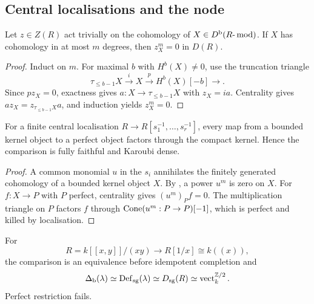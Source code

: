 \subsection{Central localisations and the node}
\begin{lemma}\label{lem:central-nilpotence}
Let \(z\in Z(R)\) act trivially on the cohomology of \(X\in D^{\mathrm b}(R\text{-}\operatorname{mod})\).  If \(X\) has cohomology in at most \(m\) degrees, then \(z_X^m=0\) in \(D(R)\).
\end{lemma}

\begin{proof}
Induct on \(m\).  For maximal \(b\) with \(H^b(X)\ne0\), use the truncation triangle
\[
 \tau_{\le b-1}X\xrightarrow{i}X\xrightarrow{p}H^b(X)[-b]\longrightarrow.
\]
Since \(pz_X=0\), exactness gives \(a:X\to\tau_{\le b-1}X\) with \(z_X=ia\).  Centrality gives \(az_X=z_{\tau_{\le b-1}X}a\), and induction yields \(z_X^m=0\).
\end{proof}

\begin{proposition}\label{prop:central-localisation}
For a finite central localisation \(R\to R[s_1^{-1},\ldots,s_r^{-1}]\), every map from a bounded kernel object to a perfect object factors through the compact kernel.  Hence the comparison is fully faithful and Karoubi dense.
\end{proposition}

\begin{proof}
A common monomial \(u\) in the \(s_i\) annihilates the finitely generated cohomology of a bounded kernel object \(X\).  By , a power \(u^m\) is zero on \(X\).  For \(f:X\to P\) with \(P\) perfect, centrality gives \((u^m)_Pf=0\).  The multiplication triangle on \(P\) factors \(f\) through \(\operatorname{Cone}(u^m:P\to P)[-1]\), which is perfect and killed by localisation.
\end{proof}

\begin{theorem}\label{thm:node}
For
\[
 R=k[[x,y]]/(xy)\longrightarrow R[1/x]\cong k((x)),
\]
the comparison is an equivalence before idempotent completion and
\[
 \Delta_{\mathrm b}(\lambda)\simeq\operatorname{Def}_{\mathrm{sg}}(\lambda)\simeq D_{\mathrm{sg}}(R)
 \simeq\operatorname{vect}_k^{\mathbb Z/2}.
\]
Perfect restriction fails.
\end{theorem}

